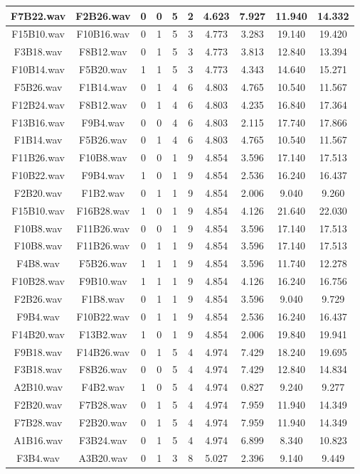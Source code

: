 \documentclass[11pt,a4paper]{book}
\begin{document}
\begin{longtable}[c]{|c|c|c|c|c|c|c|c|c|c|}
F7B22.wav&F2B26.wav&0&0&5&2&4.623&7.927&11.940&14.332\\ \hline
F15B10.wav&F10B16.wav&0&1&5&3&4.773&3.283&19.140&19.420\\ \hline
F3B18.wav&F8B12.wav&0&1&5&3&4.773&3.813&12.840&13.394\\ \hline
F10B14.wav&F5B20.wav&1&1&5&3&4.773&4.343&14.640&15.271\\ \hline
F5B26.wav&F1B14.wav&0&1&4&6&4.803&4.765&10.540&11.567\\ \hline
F12B24.wav&F8B12.wav&0&1&4&6&4.803&4.235&16.840&17.364\\ \hline
F13B16.wav&F9B4.wav&0&0&4&6&4.803&2.115&17.740&17.866\\ \hline
F1B14.wav&F5B26.wav&0&1&4&6&4.803&4.765&10.540&11.567\\ \hline
F11B26.wav&F10B8.wav&0&0&1&9&4.854&3.596&17.140&17.513\\ \hline
F10B22.wav&F9B4.wav&1&0&1&9&4.854&2.536&16.240&16.437\\ \hline
F2B20.wav&F1B2.wav&0&1&1&9&4.854&2.006&9.040&9.260\\ \hline
F15B10.wav&F16B28.wav&1&0&1&9&4.854&4.126&21.640&22.030\\ \hline
F10B8.wav&F11B26.wav&0&0&1&9&4.854&3.596&17.140&17.513\\ \hline
F10B8.wav&F11B26.wav&0&1&1&9&4.854&3.596&17.140&17.513\\ \hline
F4B8.wav&F5B26.wav&1&1&1&9&4.854&3.596&11.740&12.278\\ \hline
F10B28.wav&F9B10.wav&1&1&1&9&4.854&4.126&16.240&16.756\\ \hline
F2B26.wav&F1B8.wav&0&1&1&9&4.854&3.596&9.040&9.729\\ \hline
F9B4.wav&F10B22.wav&0&1&1&9&4.854&2.536&16.240&16.437\\ \hline
F14B20.wav&F13B2.wav&1&0&1&9&4.854&2.006&19.840&19.941\\ \hline
F9B18.wav&F14B26.wav&0&1&5&4&4.974&7.429&18.240&19.695\\ \hline
F3B18.wav&F8B26.wav&0&0&5&4&4.974&7.429&12.840&14.834\\ \hline
A2B10.wav&F4B2.wav&1&0&5&4&4.974&0.827&9.240&9.277\\ \hline
F2B20.wav&F7B28.wav&0&1&5&4&4.974&7.959&11.940&14.349\\ \hline
F7B28.wav&F2B20.wav&0&1&5&4&4.974&7.959&11.940&14.349\\ \hline
A1B16.wav&F3B24.wav&0&1&5&4&4.974&6.899&8.340&10.823\\ \hline
F3B4.wav&A3B20.wav&0&1&3&8&5.027&2.396&9.140&9.449\\ \hline

\end{longtable}
\end{document}
